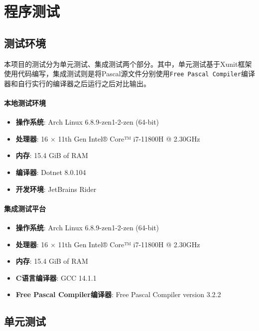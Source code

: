 \documentclass[../main.tex]{subfiles}
\begin{document}
\section{程序测试}


\subsection{测试环境}

本项目的测试分为单元测试、集成测试两个部分。其中，单元测试基于Xunit框架使用代码编写，集成测试则是将Pascal源文件分别使用\texttt{Free Pascal Compiler}编译器和自行实行的编译器之后运行之后对比输出。

\paragraph{本地测试环境}
\begin{itemize}
  \item \textbf{操作系统}: Arch Linux 6.8.9-zen1-2-zen (64-bit)
  \item \textbf{处理器}: 16 × 11th Gen Intel® Core™ i7-11800H @ 2.30GHz
  \item \textbf{内存}: 15.4 GiB of RAM
  \item \textbf{编译器}: Dotnet 8.0.104
  \item \textbf{开发环境}: JetBrains Rider
\end{itemize}

\paragraph{集成测试平台}
\begin{itemize}
  \item \textbf{操作系统}: Arch Linux 6.8.9-zen1-2-zen (64-bit)
  \item \textbf{处理器}: 16 × 11th Gen Intel® Core™ i7-11800H @ 2.30GHz
  \item \textbf{内存}: 15.4 GiB of RAM
  \item \textbf{C语言编译器}: GCC 14.1.1
  \item \textbf{Free Pascal Compiler编译器}: Free Pascal Compiler version 3.2.2
\end{itemize}

\subsection{单元测试}
\end{document}
